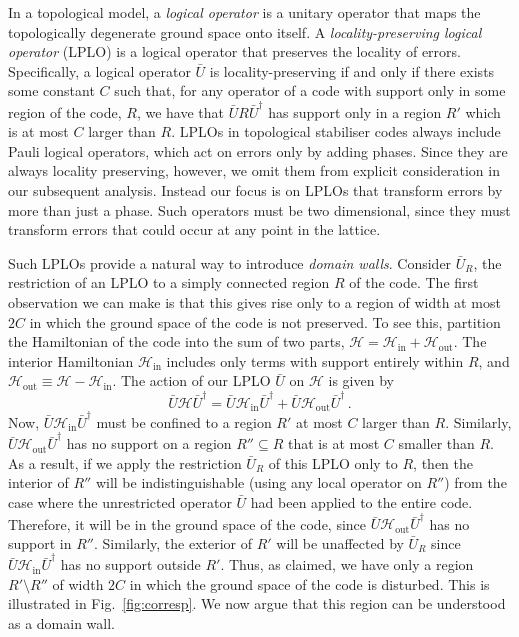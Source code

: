 \documentclass[pra,twocolumn,a4paper,nofootinbib]{revtex4-1}
\begin{document}
In a topological model, a \emph{logical operator} is a unitary operator that maps the topologically degenerate ground space onto itself. 
A \emph{locality-preserving logical operator} (LPLO) is a logical operator that preserves the locality of errors. Specifically, a logical operator $\bar{U}$ is locality-preserving if and only if there exists some constant $C$ such that, for any operator of a code with support only in some region of the code, $R$, we have that $\bar{U}R\bar{U}^\dag$ has support only in a region $R'$ which is at most $C$ larger than $R$. LPLOs in topological stabiliser codes always include Pauli logical operators, which act on errors only by adding phases. Since they are always locality preserving, however, we omit them from explicit consideration in our subsequent analysis. Instead our focus is on LPLOs that transform errors by more than just a phase. Such operators must be two dimensional, since they must transform errors that could occur at any point in the lattice.

Such LPLOs provide a natural way to introduce \emph{domain walls}.  Consider $\bar{U}_R$, the restriction of an LPLO to a simply connected region $R$ of the code. The first observation we can make is that this gives rise only to a region of width at most $2C$ in which the ground space of the code is not preserved. To see this, partition the Hamiltonian of the code into the sum of two parts, $\mathcal{H} = \mathcal{H}_{\text{in}} + \mathcal{H}_{\text{out}}$.  The interior Hamiltonian $\mathcal{H}_{\text{in}}$ includes only terms with support entirely within $R$, and $\mathcal{H}_\text{out} \equiv \mathcal{H}-\mathcal{H}_{\text{in}}$.  The action of our LPLO $\bar{U}$ on $\mathcal{H}$ is given by
\begin{equation}
\bar{U} \mathcal{H}\bar{U}^\dag = \bar{U} \mathcal{H}_{\text{in}}\bar{U}^\dag + \bar{U} \mathcal{H}_{\text{out}}\bar{U}^\dag \,.
\end{equation}
Now, $\bar{U} \mathcal{H}_{\text{in}}\bar{U}^\dag$ must be confined to a region $R'$ at most $C$ larger than $R$.  Similarly, $\bar{U} \mathcal{H}_\text{out} \bar{U}^\dagger$ has no support on a region $R'' \subseteq R$ that is at most $C$ smaller than $R$.  As a result, if we apply the restriction $\bar{U}_R$ of this LPLO only to $R$, then the interior of $R''$ will be indistinguishable (using any local operator on $R''$) from the case where the unrestricted operator $\bar{U}$ had been applied to the entire code. Therefore, it will be in the ground space of the code, since $\bar{U}\mathcal{H}_{\text{out}}\bar{U}^\dag$ has no support in $R''$. Similarly, the exterior of $R'$ will be unaffected by $\bar{U}_R$ since $\bar{U}\mathcal{H}_{\text{in}}\bar{U}^\dag$ has no support outside $R'$. Thus, as claimed, we have only a region $R' \setminus R''$ of width $2C$ in which the ground space of the code is disturbed. This is illustrated in Fig.~\ref{fig:corresp}. We now argue that this region can be understood as a domain wall.
\end{document}
